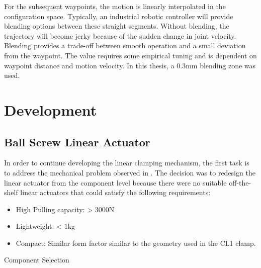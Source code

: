 For the subsequent waypoints, the motion is linearly interpolated in the configuration space. Typically, an industrial robotic controller will provide blending options between these straight segments. Without blending, the trajectory will become 	jerky because of the sudden change in joint velocity. Blending provides a trade-off between smooth operation and a small deviation from the waypoint. The value requires some empirical tuning and is dependent on waypoint distance and motion velocity. In this thesis, a 0.3mm blending zone was used. 

\section{Development}
\label{section:exploration-2-development}

\subsection{Ball Screw Linear Actuator}
\label{subsection:exploration-2-ball-screw-linear-actuator}

In order to continue developing the linear clamping mechanism, the first task is to address the mechanical problem observed in . The decision was to redesign the linear actuator from the component level because there were no suitable off-the-shelf linear actuators that could satisfy the following requirements:
\begin{itemize}
    \item High Pulling capacity: > 3000N
    \item Lightweight: < 1kg
    \item Compact: Similar form factor similar to the geometry used in the CL1 clamp.
\end{itemize}

Component Selection

